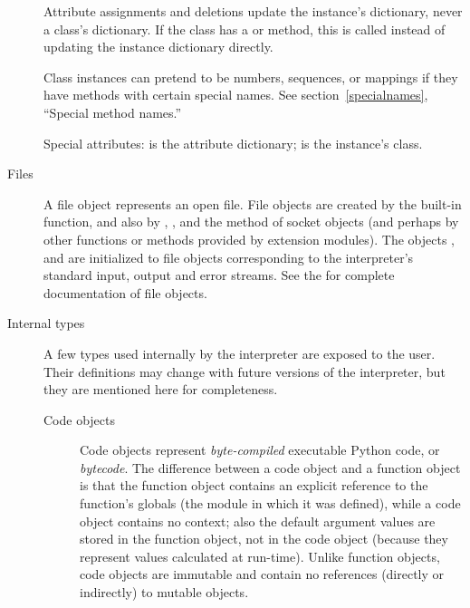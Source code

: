 \begin{description}
Attribute assignments and deletions update the instance's dictionary,
never a class's dictionary.  If the class has a  or
 method, this is called instead of updating the
instance dictionary directly.

Class instances can pretend to be numbers, sequences, or mappings if
they have methods with certain special names.  See
section~\ref{specialnames}, ``Special method names.''

Special attributes:  is the attribute
dictionary;  is the instance's class.

\item[Files]
A file object represents an open file.  File objects are
created by the  built-in function,
and also by
,
, and the
method of socket objects (and perhaps by other functions or methods
provided by extension modules).  The objects
,
 and
 are initialized to file objects
corresponding to the interpreter's standard input, output
and error streams.  See the  for complete documentation of file objects.


\item[Internal types]
A few types used internally by the interpreter are exposed to the user.
Their definitions may change with future versions of the interpreter,
but they are mentioned here for completeness.

\begin{description}

\item[Code objects]
Code objects represent \emph{byte-compiled} executable Python code, or 
\emph{bytecode}.
The difference between a code
object and a function object is that the function object contains an
explicit reference to the function's globals (the module in which it
was defined), while a code object contains no context; 
also the default argument values are stored in the function object,
not in the code object (because they represent values calculated at
run-time).  Unlike function objects, code objects are immutable and
contain no references (directly or indirectly) to mutable objects.


\end{description}
\end{description}
